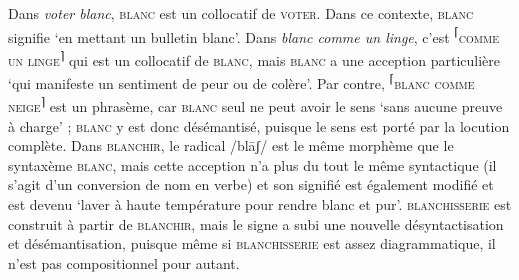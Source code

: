 {     Dans \textit{voter blanc}, \textsc{blanc} est un collocatif de \textsc{voter}. Dans ce contexte, \textsc{blanc} signifie ‘en mettant un bulletin blanc’. Dans \textit{blanc comme un linge}, c’est \textrm{\textsuperscript{⌈}}\textsc{comme} \textsc{un} \textsc{linge}\textrm{\textsuperscript{⌉}} qui est un collocatif de \textsc{blanc}, mais \textsc{blanc} a une acception particulière ‘qui manifeste un sentiment de peur ou de colère’. Par contre, \textrm{\textsuperscript{⌈}}\textsc{blanc} \textsc{comme} \textsc{neige}\textrm{\textsuperscript{⌉}} est un phrasème, car \textsc{blanc} seul ne peut avoir le sens ‘sans aucune preuve à charge’ ; \textsc{blanc} y est donc désémantisé, puisque le sens est porté par la locution complète. Dans \textsc{blanchir,} le radical /blāʃ/ est le même morphème que le syntaxème \textsc{blanc}, mais cette acception n’a plus du tout le même syntactique (il s’agit d’un conversion de nom en verbe) et son signifié est également modifié et est devenu ‘laver à haute température pour rendre blanc et pur’. \textsc{blanchisserie} est construit à partir de \textsc{blanchir}, mais le signe a subi une nouvelle désyntactisation et désémantisation, puisque même si \textsc{blanchisserie} est assez diagrammatique, il n’est pas compositionnel pour autant.
}
